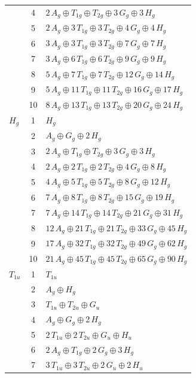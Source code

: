 \documentclass[11pt]{article}
\begin{document}
\begin{longtable}{l c p{}}
 & 4 & $2\,A_{g}\oplus T_{1g}\oplus T_{2g}\oplus 3\,G_{g}\oplus 3\,H_{g}$\\
 & 5 & $2\,A_{g}\oplus 3\,T_{1g}\oplus 3\,T_{2g}\oplus 4\,G_{g}\oplus 4\,H_{g}$\\
 & 6 & $3\,A_{g}\oplus 3\,T_{1g}\oplus 3\,T_{2g}\oplus 7\,G_{g}\oplus 7\,H_{g}$\\
 & 7 & $3\,A_{g}\oplus 6\,T_{1g}\oplus 6\,T_{2g}\oplus 9\,G_{g}\oplus 9\,H_{g}$\\
 & 8 & $5\,A_{g}\oplus 7\,T_{1g}\oplus 7\,T_{2g}\oplus 12\,G_{g}\oplus 14\,H_{g}$\\
 & 9 & $5\,A_{g}\oplus 11\,T_{1g}\oplus 11\,T_{2g}\oplus 16\,G_{g}\oplus 17\,H_{g}$\\
 & 10 & $8\,A_{g}\oplus 13\,T_{1g}\oplus 13\,T_{2g}\oplus 20\,G_{g}\oplus 24\,H_{g}$\\
\hline
$H_{g}$ & 1 & $H_{g}$\\
 & 2 & $A_{g}\oplus G_{g}\oplus 2\,H_{g}$\\
 & 3 & $2\,A_{g}\oplus T_{1g}\oplus T_{2g}\oplus 3\,G_{g}\oplus 3\,H_{g}$\\
 & 4 & $2\,A_{g}\oplus 2\,T_{1g}\oplus 2\,T_{2g}\oplus 4\,G_{g}\oplus 8\,H_{g}$\\
 & 5 & $4\,A_{g}\oplus 5\,T_{1g}\oplus 5\,T_{2g}\oplus 8\,G_{g}\oplus 12\,H_{g}$\\
 & 6 & $7\,A_{g}\oplus 8\,T_{1g}\oplus 8\,T_{2g}\oplus 15\,G_{g}\oplus 19\,H_{g}$\\
 & 7 & $7\,A_{g}\oplus 14\,T_{1g}\oplus 14\,T_{2g}\oplus 21\,G_{g}\oplus 31\,H_{g}$\\
 & 8 & $12\,A_{g}\oplus 21\,T_{1g}\oplus 21\,T_{2g}\oplus 33\,G_{g}\oplus 45\,H_{g}$\\
 & 9 & $17\,A_{g}\oplus 32\,T_{1g}\oplus 32\,T_{2g}\oplus 49\,G_{g}\oplus 62\,H_{g}$\\
 & 10 & $21\,A_{g}\oplus 45\,T_{1g}\oplus 45\,T_{2g}\oplus 65\,G_{g}\oplus 90\,H_{g}$\\
\hline
$T_{1u}$ & 1 & $T_{1u}$\\
 & 2 & $A_{g}\oplus H_{g}$\\
 & 3 & $T_{1u}\oplus T_{2u}\oplus G_{u}$\\
 & 4 & $A_{g}\oplus G_{g}\oplus 2\,H_{g}$\\
 & 5 & $2\,T_{1u}\oplus 2\,T_{2u}\oplus G_{u}\oplus H_{u}$\\
 & 6 & $2\,A_{g}\oplus T_{1g}\oplus 2\,G_{g}\oplus 3\,H_{g}$\\
 & 7 & $3\,T_{1u}\oplus 3\,T_{2u}\oplus 2\,G_{u}\oplus 2\,H_{u}$\\

\end{longtable}
\end{document}
